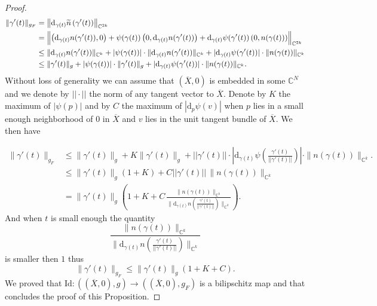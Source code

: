 \documentclass[reqno,dvipsnames,12pt]{amsart}
\begin{document}
\begin{proof}
$$
\begin{aligned}
\|\gamma'(t)\|_{g_F} 
&= \bigl\|\mathrm{d}_{\gamma(t)} \widetilde{n}\left(\gamma'(t)\right)\bigr\|_{\mathbb{C}^{2k}} \\
&= \Bigl\|
    \left(\mathrm{d}_{\gamma(t)} n(\gamma'(t)),0\right) 
    + \psi(\gamma(t))\left(0,\mathrm{d}_{\gamma(t)} n(\gamma'(t))\right) 
    + \mathrm{d}_{\gamma(t)}\psi(\gamma'(t)) \left( 0,n(\gamma(t)) \right)
    \Bigr\|_{\mathbb{C}^{2k}} \\
&\leq 
    \|\mathrm{d}_{\gamma(t)} n(\gamma'(t))\|_{\mathbb{C}^{k}}+ |\psi(\gamma(t))|\cdot \|\mathrm{d}_{\gamma(t)} n(\gamma'(t))\|_{\mathbb{C}^{k}} + |\mathrm{d}_{\gamma(t)}\psi(\gamma'(t))|\cdot \|n(\gamma(t))\|_{\mathbb{C}^{k}} \\
&\leq 
    \|\gamma'(t)\|_{g} 
    + |\psi(\gamma(t))|\cdot \|\gamma'(t)\|_{g} 
    + |\mathrm{d}_{\gamma(t)}\psi(\gamma'(t))|\cdot \|n(\gamma(t))\|_{\mathbb{C}^{k}}.
\end{aligned}
$$
Without loss of generality we can assume that $(\overline{X},0)$ is embedded in some $\mathbb{C}^N$ and we denote by $||\cdot||$ the norm  of any tangent vector to $\overline{X}$. 
Denote by $K$ the maximum of $|\psi(p)|$ and by $C$ the maximum of $|\mathrm{d}_p\psi(v)|$ when $p$ lies in a small enough neighborhood of $0$ in $\overline{X}$ and $v$ lies in the unit tangent bundle of $\overline{X}$. 
We then have

$$
\begin{aligned}
\|\gamma'(t)\|_{g_F} &\leq 
    \|\gamma'(t)\|_{g} 
    + K\|\gamma'(t)\|_{g} 
    + ||\gamma'(t)||\cdot \left|\mathrm{d}_{\gamma(t)} \psi\left(\frac{\gamma'(t)}{||\gamma'(t)||}\right) \right|\cdot \|n(\gamma(t))\|_{\mathbb{C}^{k}}.\\
&\leq   
   \|\gamma'(t)\|_{g} ( 1+K )  
    + C||\gamma'(t)|| \,\|n(\gamma(t))\|_{\mathbb{C}^k} \\
&=
    \|\gamma'(t)\|_{g} 
    \left( 
        1+K  
        + C\,\frac{\|n(\gamma(t))\|_{\mathbb{C}^k}}
       {\|\mathrm{d}_{\gamma(t)} n \left(\frac{\gamma'(t)}{||\gamma'(t)||}\right)\|_{\mathbb{C}^{k}}}
    \right).
    \end{aligned}
$$
And when $t$ is small enough the quantity 
$$
\frac{\|n(\gamma(t))\|_{\mathbb{C}^k}}
       {\|\mathrm{d}_{\gamma(t)} n \left(\frac{\gamma'(t)}{||\gamma'(t)||}\right)\|_{\mathbb{C}^{k}}}
$$ is smaller then $1$ thus
 $$\|\gamma'(t)\|_{g_F} \leq \|\gamma'(t)\|_{g}(1+K+C).$$ 
 We proved that  $\mathrm{Id}:\left( (\overline{X},0), g\right) \longrightarrow  \left( (\overline{X},0), g_F \right) $ is a bilipschitz map and that concludes the proof of this Proposition.
\end{proof}
\end{document}

